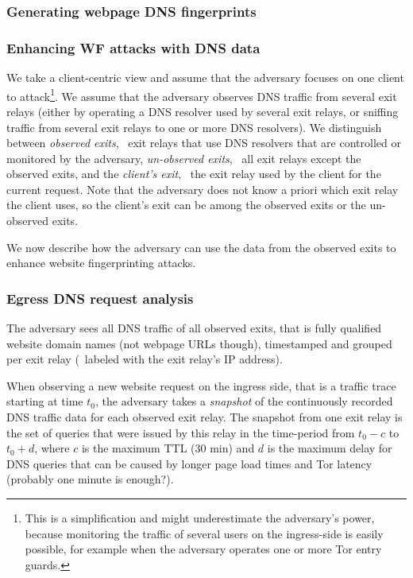 \subsubsection{Generating webpage DNS fingerprints}

\subsubsection{Enhancing WF attacks with DNS data}

We take a client-centric view and assume that the adversary focuses on
one client to attack\footnote{This is a simplification and might
underestimate the adversary's power, because monitoring the traffic of
several users on the ingress-side is easily possible, for example when
the adversary operates one or more Tor entry guards.}.
%
We assume that the adversary observes DNS traffic from several exit
relays (either by operating a DNS resolver used by several exit relays,
or sniffing traffic from several exit relays to one or more DNS
resolvers).
%
We distinguish between \emph{observed exits}, \ie~exit relays that use
DNS resolvers that are controlled or monitored by the adversary,
\emph{un-observed exits}, \ie~all exit relays except the observed exits,
and the \emph{client's exit}, \ie~the exit relay used by the client for
the current request.
%
Note that the adversary does not know a priori which exit relay the
client uses, so the client's exit can be among the observed exits or the
un-observed exits.

%
We now describe how the adversary can use the data from the observed
exits to enhance website fingerprinting attacks.


\subsubsection{Egress DNS request analysis}

The adversary sees all DNS traffic of all observed exits, that is fully
qualified website domain names (not webpage URLs though), timestamped
and grouped per exit relay (\eg~labeled with the exit relay's IP
address).

When observing a new website request on the ingress side, that is a
traffic trace starting at time $t_0$, the adversary takes a
\emph{snapshot} of the continuously recorded DNS traffic data for each
observed exit relay. The snapshot from one exit relay is the set of
queries that were issued by this relay in the time-period from $t_0 - c$
to $t_0 + d$, where $c$ is the maximum TTL (30 min) and $d$ is the
maximum delay for DNS queries that can be caused by longer page load
times and Tor latency (probably one minute is enough?).

